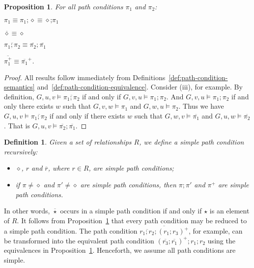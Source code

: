 \documentclass{article}
\newtheorem{definition}{Definition}
\newtheorem{proposition}{Proposition}
\newcommand{\comp}{\mathbin{;}}
\begin{document}
\begin{proposition}\label{pro:simple-equivalences}
For all path conditions $\pi_1$ and $\pi_2$:
   \begin{inparaenum}[\em (i)]
    \item $\pi_1 \equiv \pi_1 \comp \diamond \equiv \diamond \comp \pi_1$
    \item $\overline{\diamond} \equiv \diamond$
    \item $\overline{\pi_1 \comp \pi_2} \equiv \overline{\pi_2} \comp \overline{\pi_1}$
    \item $\overline{\pi_1^+} \equiv \overline{\pi_1}^+$.
   \end{inparaenum}
\end{proposition}


\begin{proof}
 All results follow immediately from Definitions~\ref{def:path-condition-semantics} and~\ref{def:path-condition-equivalence}.
 Consider (iii), for example.
 By definition, $G,u,v \models \overline{\pi_1 \comp \pi_2}$ if and only if $G,v,u \models \pi_1 \comp \pi_2$.
 And $G,v,u \models \pi_1 \comp \pi_2$ if and only there exists $w$ such that $G,v,w \models \pi_1$ and $G,w,u \models \pi_2$.
 Thus we have $G,u,v \models \overline{\pi_1 \comp \pi_2}$ if and only if there exists $w$ such that $G,w,v \models \overline{\pi_1}$ and $G,u,w \models \overline{\pi_2}$.
 That is $G,u,v \models \overline{\pi_2} \comp \overline{\pi_1}$.
\end{proof}

\begin{definition}
   Given a set of relationships $R$, we define a \emph{simple path condition} recursively:
    \begin{itemize}
	\item $\diamond$, $r$ and $\overline{r}$, where $r \in R$, are simple path conditions;
        \item if $\pi \ne \diamond$ and $\pi' \ne \diamond$ are simple path conditions, then $\pi \comp \pi'$ and $\pi^+$ are simple path conditions.
    \end{itemize}
\end{definition}

In other words, $\overline{\star}$ occurs in a simple path condition if and only if $\star$ is an element of $R$.
It follows from Proposition~\ref{pro:simple-equivalences} that every path condition may be reduced to a simple path condition.
The path condition $\overline{\overline{r_1 \comp r_2} \comp (r_1 \comp r_3)^+}$, for example, can be transformed into the equivalent path condition $(\overline{r_3} \comp \overline{r_1})^+ \comp r_1 \comp r_2$ using the equivalences in Proposition~\ref{pro:simple-equivalences}.
Henceforth, we assume all path conditions are simple.
\end{document}
